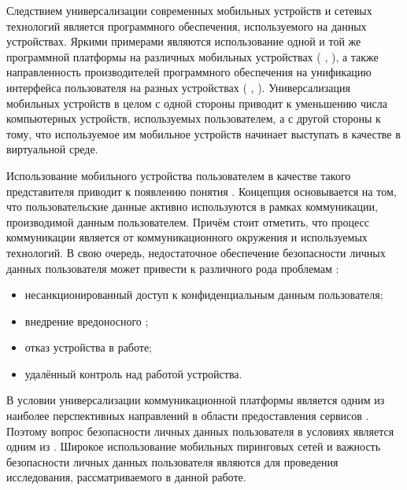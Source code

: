 \Sentence
Следствием универсализации современных мобильных устройств и сетевых технологий является 
 программного обеспечения, используемого на данных устройствах.
\Sentence
Яркими примерами являются использование одной и той же программной платформы на различных мобильных 
устройствах ( ,  ), а также 
направленность производителей программного обеспечения на унификацию интерфейса пользователя на 
разных устройствах ( ,  ).
\Sentence
Универсализация мобильных устройств в целом с одной стороны приводит к уменьшению числа компьютерных 
устройств, используемых пользователем, а с другой стороны к тому, что используемое им мобильное 
устройств начинает выступать в качестве  в 
виртуальной среде.

\Sentence
Использование мобильного устройства пользователем в качестве такого представителя приводит к 
появлению понятия  
.
\Sentence
Концепция  основывается на том, что пользовательские данные 
активно используются в рамках коммуникации, производимой данным пользователем.
\Sentence
Причём стоит отметить, что процесс коммуникации является  от 
коммуникационного окружения и используемых технологий.
\Sentence
В свою очередь, недостаточное обеспечение безопасности личных данных пользователя может привести 
к различного рода проблемам :
\begin{itemize}
	\item несанкционированный доступ к конфиденциальным данным пользователя;
	\item внедрение вредоносного ;
	\item отказ устройства в работе;
	\item удалённый контроль над работой устройства.
\end{itemize}

\Sentence
В условии универсализации коммуникационной платформы  является одним из 
наиболее перспективных направлений в области предоставления сервисов .
\Sentence
Поэтому вопрос безопасности личных данных пользователя в условиях является одним из 
.
\Sentence
Широкое использование мобильных пиринговых сетей и важность безопасности личных данных пользователя 
являются  для проведения исследования, рассматриваемого 
в данной работе.